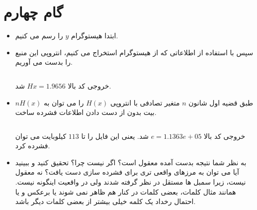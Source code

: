 \def \Subject {گام چهارم}


\section{\Subject}

\begin{itemize}
\item 
{
ابتدا هیستوگرام 
\(y\)
را رسم می کنیم.
  \begin{figure}[h!]
    \centering
\end{figure}
}
\item  
{
سپس با استفاده از اطلاعاتی که از هیستوگرام استخراج می کنیم، انتروپی این منبع را بدست می آوریم.

\begin{latin}
    \inputminted[frame=none]{csharp}{s_4_1.cs}
\end{latin}

خروجی کد بالا
\(Hx = 1.9656\)
شد.
}
\item 
{
طبق قضیه اول شانون 
\(n\)
متغیر تصادفی با انتروپی 
\(H(x)\)
را می توان به 
\(nH(x)\)
بیت بدون از دست دادن اطلاعات فشرده ساخت.

\begin{latin}
    \inputminted[frame=none]{csharp}{s_4_2.cs}
\end{latin}



خروجی کد بالا
\(e = 1.1363e+05\)
شد. یعنی این فایل را تا 
\(113\)
کیلوبایت می توان فشرده کرد.
}
\item{
به نظر شما نتیجه بدست آمده معقول است؟ اگر نیست چرا؟ تحقیق کنید و ببینید آیا می توان به مرزهای
واقعی تری برای فشرده سازی دست یافت؟
نه معقول نیست، زیرا سمبل ها مستقل در نظر گرفته شدند ولی در واقعیت اینگونه نیست. همانند مثال کلمات، بعضی کلمات در کنار هم ظاهر نمی شوند یا برعکس و یا احتمال رخداد یک کلمه خیلی بیشتر از بعضی کلمات دیگر باشد. 
}
\end{itemize}




